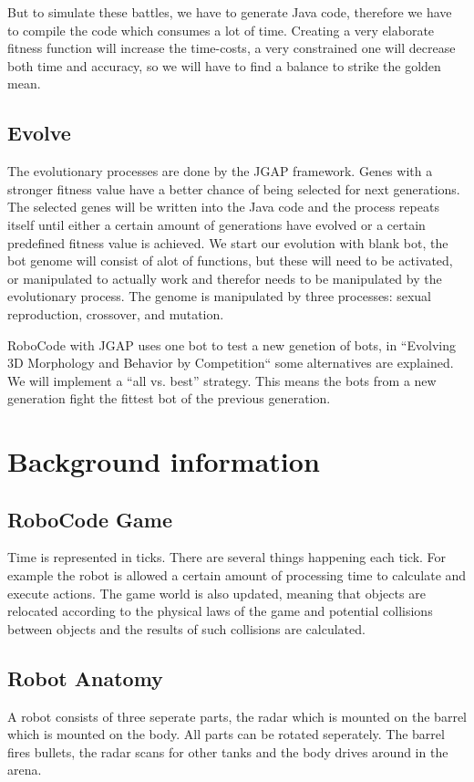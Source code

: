 \documentclass[a4paper,10pt]{article}
\begin{document}
But to simulate these battles, we have to generate Java code, therefore we have to compile the code which consumes a lot of time. Creating a very elaborate fitness function will increase the time-costs, a very constrained one will decrease both time and accuracy, so we will have to find a balance to strike the golden mean.

\subsection{Evolve}
The evolutionary processes are done by the JGAP framework. Genes with a stronger fitness value have a better chance of being selected for next generations. The selected genes will be written into the Java code and the process repeats itself until either a certain amount of generations have evolved or a certain predefined fitness value is achieved.
We start our evolution with blank bot, the bot genome will consist of alot of functions, but these will need to be activated, or manipulated to actually work and therefor needs to be manipulated by the evolutionary process. The genome is manipulated by three processes: sexual reproduction, crossover, and mutation.

RoboCode with JGAP uses one bot to test a new genetion of bots, in ``Evolving 3D Morphology and Behavior by Competition``\cite{karlsims} some alternatives are explained. We will implement a ``all vs. best'' strategy. This means the bots from a new generation fight the fittest bot of the previous generation.

\section{Background information}
\label{bi}
\subsection{RoboCode Game}
Time is represented in ticks. There are several things happening each tick. For example the robot is allowed a certain amount of processing time to calculate and execute actions. The game world is also updated, meaning that objects are relocated according to the physical laws of the game and potential collisions between objects and the results of such collisions are calculated.

\subsection{Robot Anatomy}
A robot consists of three seperate parts, the radar which is mounted on the barrel which is mounted on the body. All parts can be rotated seperately. The barrel fires bullets, the radar scans for other tanks and the body drives around in the arena. 
\end{document}
